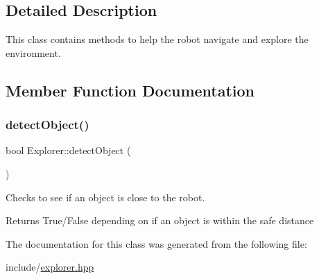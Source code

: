\subsection{Detailed Description}
This class contains methods to help the robot navigate and explore the environment. 

\subsection{Member Function Documentation}
\mbox{\label{classExplorer_a78d779c3481f8efdac866b8d7f5065db}} 
\subsubsection{\texorpdfstring{detect\+Object()}{detectObject()}}
{\footnotesize\ttfamily bool Explorer\+::detect\+Object (\begin{DoxyParamCaption}{ }\end{DoxyParamCaption})}



Checks to see if an object is close to the robot. 

\begin{DoxyReturn}{Returns}
True/\+False depending on if an object is within the safe distance 
\end{DoxyReturn}


The documentation for this class was generated from the following file\+:\begin{DoxyCompactItemize}
\item 
include/\hyperlink{explorer_8hpp}{explorer.\+hpp}\end{DoxyCompactItemize}
